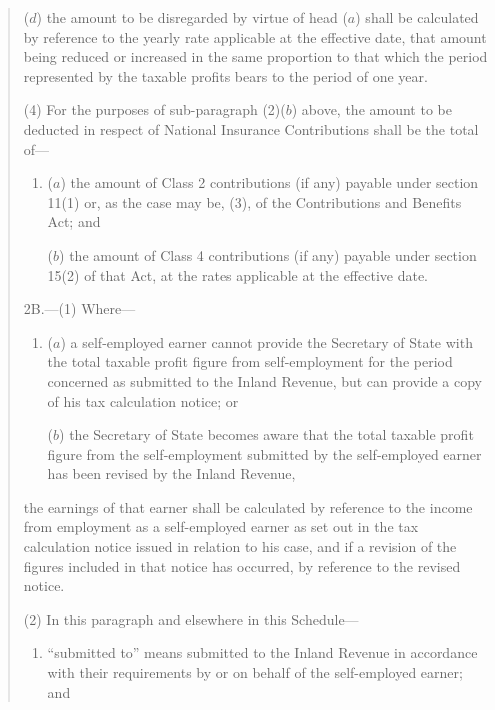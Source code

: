 \documentclass[12pt,a4paper]{article}
\begin{document}
\begin{enumerate}
\begin{quotation}
\begin{enumerate}
($d$) the amount to be disregarded by virtue of head ($a$) shall be calculated by reference to the yearly rate applicable at the effective date, that amount being reduced or increased in the same proportion to that which the period represented by the taxable profits bears to the period of one year.
\end{enumerate}

(4) For the purposes of sub-paragraph (2)($b$) above, the amount to be deducted in respect of National Insurance Contributions shall be the total of—
\begin{enumerate}\item[]
($a$) the amount of Class 2 contributions (if any) payable under section 11(1) or, as the case may be, (3), of the Contributions and Benefits Act; and

($b$) the amount of Class 4 contributions (if any) payable under section 15(2) of that Act,
at the rates applicable at the effective date.
\end{enumerate}

\medskip

2B.—(1) Where—
\begin{enumerate}\item[]
($a$) a self-employed earner cannot provide the 
Secretary of State  %
with the total taxable profit figure from self-employment for the period concerned as submitted to the Inland Revenue, but can provide a copy of his tax calculation notice; or

($b$) the 
Secretary of State  %
becomes aware that the total taxable profit figure from the self-employment submitted by the self-employed earner has been revised by the Inland Revenue,
\end{enumerate}
the earnings of that earner shall be calculated by reference to the income from employment as a self-employed earner as set out in the tax calculation notice issued in relation to his case, and if a revision of the figures included in that notice has occurred, by reference to the revised notice.

(2) In this paragraph and elsewhere in this Schedule—
\begin{enumerate}\item[]
“submitted to” means submitted to the Inland Revenue in accordance with their requirements by or on behalf of the self-employed earner; and


\end{enumerate}
\end{quotation}
\end{enumerate}
\end{document}
